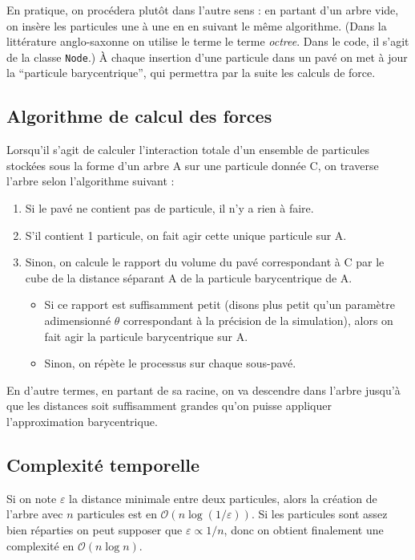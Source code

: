 \documentclass[12pt, letterpaper, twoside]{article}
\newcommand{\T}[1]{\texttt{#1}}
\def\O{\mathcal{O}}
\def\epsilon{\varepsilon}
\begin{document}
En pratique, on procédera plutôt dans l'autre sens : en partant d'un arbre vide, on insère les particules une à une en en suivant le même algorithme. (Dans la littérature anglo-saxonne on utilise le terme le terme \textit{octree}. Dans le code, il s'agit de la classe \T{Node}.) À chaque insertion d'une particule dans un pavé on met à jour la ``particule barycentrique'', qui permettra par la suite les calculs de force.

\subsection*{Algorithme de calcul des forces}
\noindent Lorsqu'il s'agit de calculer l'interaction totale d'un ensemble de particules stockées sous la forme d'un arbre A sur une particule donnée C, on traverse l'arbre selon l'algorithme suivant :

\begin{enumerate}
	\item Si le pavé ne contient pas de particule, il n'y a rien à faire.
	\item S'il contient 1 particule, on fait agir cette unique particule sur A.
	\item Sinon, on calcule le rapport du volume du pavé correspondant à C par le cube de la distance séparant A de la particule barycentrique de A.
\begin{itemize}
	\item Si ce rapport est suffisamment petit (disons plus petit qu'un paramètre adimensionné $\theta$ correspondant à la précision de la simulation), alors on fait agir la particule barycentrique sur A.
	\item Sinon, on répète le processus sur chaque sous-pavé.
\end{itemize}
\end{enumerate}
En d'autre termes, en partant de sa racine, on va descendre dans l'arbre jusqu'à que les distances soit suffisamment grandes qu'on puisse appliquer l'approximation barycentrique.
\subsection*{Complexité temporelle}
\noindent Si on note $\epsilon$ la distance minimale entre deux particules, alors la création de l'arbre avec $n$ particules est en $\O(n \log(1/\epsilon))$. Si les particules sont assez bien réparties on peut supposer que $\epsilon \propto 1/n$, donc on obtient finalement une complexité en $\O(n \log n)$.
\end{document}
